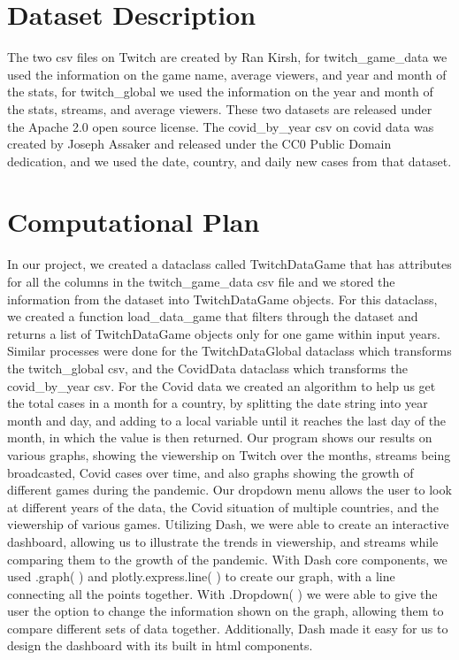 \documentclass[fontsize=11pt]{article}
\begin{document}
\section*{Dataset Description}

The two csv files on Twitch are created by Ran Kirsh,  for twitch\_game\_data we used the information on the game name, average viewers, and year and month of the stats, for twitch\_global we used the information on the year and month of the stats, streams, and average viewers. These two datasets are released under the Apache 2.0 open source license. The covid\_by\_year csv on covid data was created by Joseph Assaker and released under the CC0 Public Domain dedication, and we used the date, country, and daily new cases from that dataset.


\section*{Computational Plan}

In our project, we created a dataclass called TwitchDataGame that has attributes for all the columns in the twitch\_game\_data csv file and we stored the information from the dataset into TwitchDataGame objects. For this dataclass, we created a function load\_data\_game that filters through the dataset and returns a list of TwitchDataGame objects only for one game within input years. Similar processes were done for the TwitchDataGlobal dataclass which transforms the twitch\_global csv, and the CovidData dataclass which transforms the covid\_by\_year csv. For the Covid data we created an algorithm to help us get the total cases in a month for a country, by splitting the date string into year month and day, and adding to a local variable until it reaches the last day of the month, in which the value is then returned.
Our program shows our results on various graphs, showing the viewership on Twitch over the months, streams being broadcasted, Covid cases over time, and also graphs showing the growth of different games during the pandemic. Our dropdown menu allows the user to look at different years of the data, the Covid situation of multiple countries, and the viewership of various games.
Utilizing Dash, we were able to create an interactive dashboard, allowing us to illustrate the trends in viewership, and streams while comparing them to the growth of the pandemic. With Dash core components, we used .graph( ) and plotly.express.line( ) to create our graph, with a line connecting all the points together. With .Dropdown( ) we were able to give the user the option to change the information shown on the graph, allowing them to compare different sets of data together. Additionally, Dash made it easy for us to design the dashboard with its built in html components.
\end{document}
